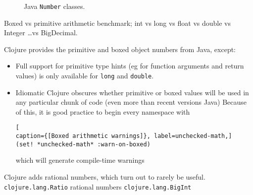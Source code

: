 
\begin{figure}[htbp]
\centering
\caption{Java \texttt{Number} classes.}
\label{fig:java-number-classes}
\end{figure}

Boxed vs primitive arithmetic benchmark; 
int vs long vs float vs double vs Integer \ldots vs BigDecimal.


\lstset{language=Clojure}

Clojure provides the primitive and boxed object numbers from Java,
except:
\begin{itemize}
  \item Full support for primitive type hints (eg for function arguments and
  return values) is only available for \lstinline|long| and \lstinline|double|.
  \item Idiomatic Clojure obscures whether primitive or boxed values will be
  used in any particular chunk of code (even more than recent versions  Java)
  Because of this, it is good practice to begin every namespace with
\begin{lstlisting}[
caption={[Boxed arithmetic warnings]}, label=unchecked-math,]  
(set! *unchecked-math* :warn-on-boxed)
\end{lstlisting}
which will generate compile-time warnings
\end{itemize}

Clojure adds rational numbers, which turn out to rarely be useful.\\
\lstinline|clojure.lang.Ratio| rational numbers
\lstinline|clojure.lang.BigInt|~\cite[p. 428]{Emerick2012ClojureProgramming}
